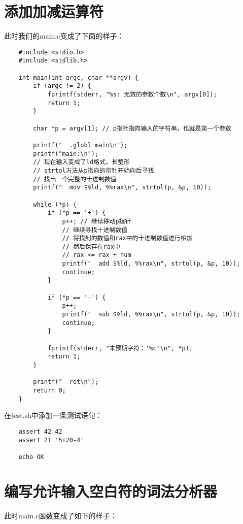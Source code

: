 \documentclass[cn,10pt,math=newtx,citestyle=gb7714-2015,bibstyle=gb7714-2015]{elegantbook}
\begin{document}
\chapter{添加加减运算符}

此时我们的main.c变成了下面的样子：

\begin{verbatim}
    #include <stdio.h>
    #include <stdlib.h>

    int main(int argc, char **argv) {
        if (argc != 2) {
            fprintf(stderr, "%s: 无效的参数个数\n", argv[0]);
            return 1;
        }

        char *p = argv[1]; // p指针指向输入的字符串，也就是第一个参数

        printf("  .globl main\n");
        printf("main:\n");
        // 现在输入变成了ld格式，长整形
        // strtol方法从p指向的指针开始向后寻找
        // 找出一个完整的十进制数值
        printf("  mov $%ld, %%rax\n", strtol(p, &p, 10));

        while (*p) {
            if (*p == '+') {
                p++; // 继续移动p指针
                // 继续寻找十进制数值
                // 将找到的数值和rax中的十进制数值进行相加
                // 然后保存在rax中
                // rax <= rax + num
                printf("  add $%ld, %%rax\n", strtol(p, &p, 10));
                continue;
            }

            if (*p == '-') {
                p++;
                printf("  sub $%ld, %%rax\n", strtol(p, &p, 10));
                continue;
            }

            fprintf(stderr, "未预期字符：'%c'\n", *p);
            return 1;
        }

        printf("  ret\n");
        return 0;
    }
\end{verbatim}

在test.sh中添加一条测试语句：

\begin{verbatim}
    assert 42 42
    assert 21 '5+20-4'

    echo OK
\end{verbatim}

\chapter{编写允许输入空白符的词法分析器}

此时main.c函数变成了如下的样子：
\end{document}
